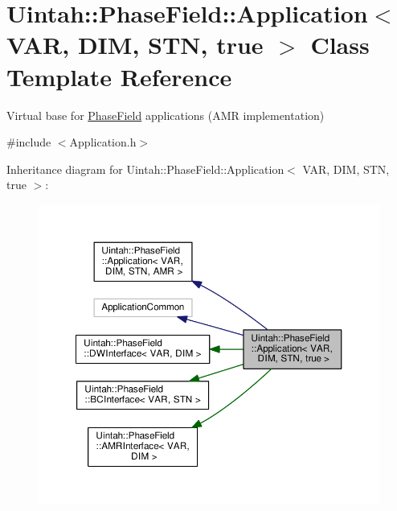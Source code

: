 \hypertarget{classUintah_1_1PhaseField_1_1Application_3_01VAR_00_01DIM_00_01STN_00_01true_01_4}{}\section{Uintah\+:\+:Phase\+Field\+:\+:Application$<$ V\+AR, D\+IM, S\+TN, true $>$ Class Template Reference}
\label{classUintah_1_1PhaseField_1_1Application_3_01VAR_00_01DIM_00_01STN_00_01true_01_4}


Virtual base for \hyperlink{namespaceUintah_1_1PhaseField}{Phase\+Field} applications (A\+MR implementation)  




{\ttfamily \#include $<$Application.\+h$>$}



Inheritance diagram for Uintah\+:\+:Phase\+Field\+:\+:Application$<$ V\+AR, D\+IM, S\+TN, true $>$\+:\nopagebreak
\begin{figure}[H]
\begin{center}
\leavevmode
\includegraphics[width=350pt]{classUintah_1_1PhaseField_1_1Application_3_01VAR_00_01DIM_00_01STN_00_01true_01_4__inherit__graph}
\end{center}
\end{figure}


